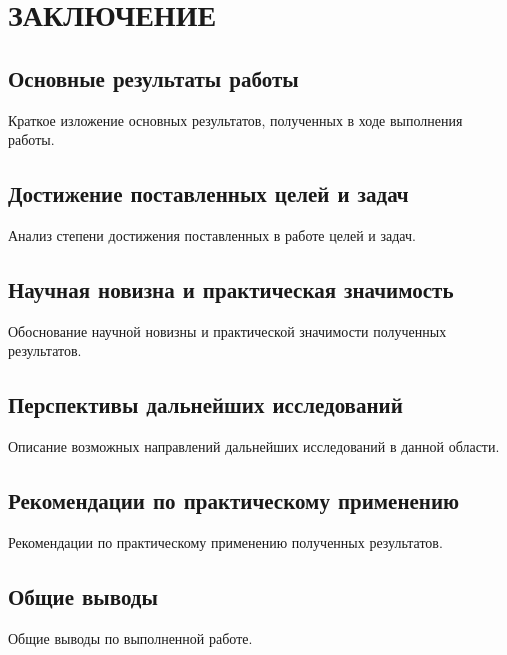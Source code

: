\chapter{ЗАКЛЮЧЕНИЕ}

\section{Основные результаты работы}

Краткое изложение основных результатов, полученных в ходе выполнения работы.

\section{Достижение поставленных целей и задач}

Анализ степени достижения поставленных в работе целей и задач.

\section{Научная новизна и практическая значимость}

Обоснование научной новизны и практической значимости полученных результатов.

\section{Перспективы дальнейших исследований}

Описание возможных направлений дальнейших исследований в данной области.

\section{Рекомендации по практическому применению}

Рекомендации по практическому применению полученных результатов.

\section{Общие выводы}

Общие выводы по выполненной работе.
